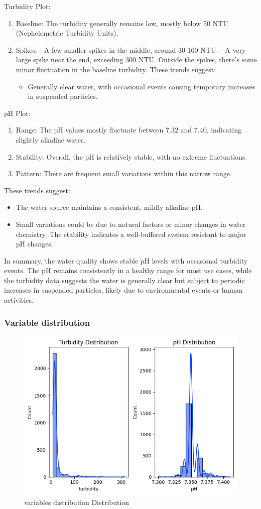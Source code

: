 \documentclass[12pt]{report}
\begin{document}
Turbidity Plot:
\begin{enumerate}
 \item Baseline: The turbidity generally remains low, mostly below 50 NTU (Nephelometric Turbidity Units).

 \item Spikes: 
   - A few smaller spikes in the middle, around 30-160 NTU.
   - A very large spike near the end, exceeding 300 NTU.
Outside the spikes, there's some minor fluctuation in the baseline turbidity.
These trends suggest:
\begin{itemize}
    \item Generally clear water, with occasional events causing temporary increases in suspended particles.
    \end{itemize}
\end{enumerate}
pH Plot:
\begin{enumerate}
    \item  Range: The pH values mostly fluctuate between 7.32 and 7.40, indicating slightly alkaline water.
\item  Stability: Overall, the pH is relatively stable, with no extreme fluctuations.
\item  Pattern: There are frequent small variations within this narrow range.
\end{enumerate}
These trends suggest:
\begin{itemize}
    \item  The water source maintains a consistent, mildly alkaline pH.
    \item Small variations could be due to natural factors or minor changes in water chemistry.
    \tem The stability indicates a well-buffered system resistant to major pH changes.
\end{itemize}
In summary, the water quality shows stable pH levels with occasional turbidity events. The pH remains consistently in a healthy range for most use  cases, while the turbidity data suggests the water is generally clear but subject to periodic increases in suspended particles, likely due to environmental events or human activities.
\clearpage
\subsubsection{Variable  distribution}
\begin{figure}[h]
    \centering
    \includegraphics[width=0.5\linewidth]{distribution.png}
    \caption{variables  distribution Distribution}
    \label{fig:enter-label}
\end{figure}
    
\end{document}
